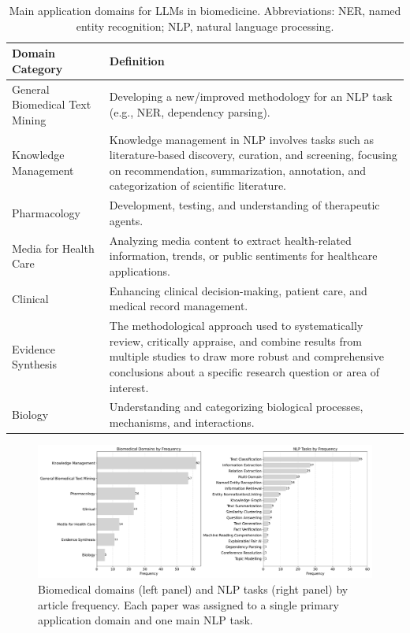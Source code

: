 \documentclass[fleqn,10pt]{olplainarticle}
\begin{document}
\begin{table}[h]
\centering
\begin{tabular}{l p{10cm}}
\hline
\textbf{Domain Category} & \textbf{Definition} \\ \hline
General Biomedical Text Mining & Developing a new/improved methodology for an NLP task (e.g., NER, dependency parsing). \\ \hline
Knowledge Management & Knowledge management in NLP involves tasks such as literature-based discovery, curation, and screening, focusing on recommendation, summarization, annotation, and categorization of scientific literature. \\ \hline
Pharmacology & Development, testing, and understanding of therapeutic agents. \\ \hline
Media for Health Care & Analyzing media content to extract health-related information, trends, or public sentiments for healthcare applications. \\ \hline
Clinical & Enhancing clinical decision-making, patient care, and medical record management. \\ \hline
Evidence Synthesis & The methodological approach used to systematically review, critically appraise, and combine results from multiple studies to draw more robust and comprehensive conclusions about a specific research question or area of interest. \\ \hline
Biology & Understanding and categorizing biological processes, mechanisms, and interactions. \\ \hline

\end{tabular}
\caption{Main application domains for LLMs in biomedicine. Abbreviations: NER, named entity recognition; NLP, natural language processing.}
\label{table:domains_application}
\end{table}

\begin{figure}[!h]
\begin{center}
\includegraphics[scale=0.30]{visuals/new_pdf/domains_and_nlp_tasks_frequency_2024.pdf} %
\caption{Biomedical domains (left panel) and NLP tasks (right panel) by article frequency. Each paper was assigned to a single primary application domain and one main NLP task.}
\label{fig:domains_and_nlp_tasks_frequency}
\end{center}
\end{figure}
\end{document}
